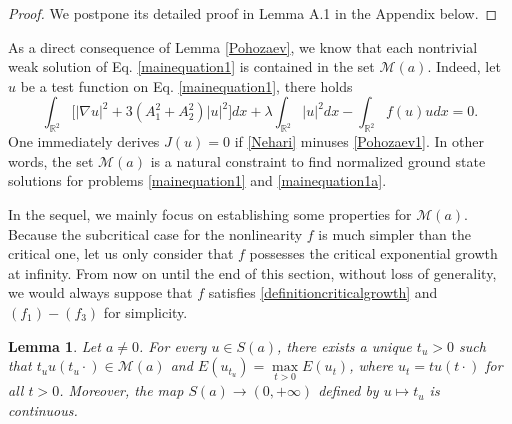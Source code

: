 \documentclass[11pt]{amsart}
\numberwithin{equation}{section}
\newtheorem{lemma}[theorem]{Lemma}
\theoremstyle{definition}
\newcommand{\R}{\mathbb{R}}
\begin{document}
\begin{proof}
We postpone its
 detailed proof in Lemma A.1 in the Appendix below.
\end{proof}

As a direct consequence of Lemma \ref{Pohozaev}, we know that each nontrivial weak solution of Eq. \eqref{mainequation1}
is contained in the set $\mathcal{M}(a)$. Indeed, let $u$ be a test function on Eq. \eqref{mainequation1}, there holds
\begin{equation}\label{Nehari}
\int_{\R^2}\big[|\nabla u|^2 +3(A_1^2+A_2^2)|u|^2\big]dx+ \lambda\int_{\R^2}|u|^2dx
- \int_{\R^2}f(u)udx
=0.
\end{equation}
One immediately derives $J(u)=0$ if \eqref{Nehari} minuses \eqref{Pohozaev1}. In other words, the set $\mathcal{M}(a)$
is a natural constraint to find normalized ground state solutions for problems \eqref{mainequation1}
and \eqref{mainequation1a}.


In the sequel, we mainly focus on establishing some properties for $\mathcal{M}(a)$.
Because the subcritical case for the nonlinearity $f$ is much simpler than the critical one,
let us only consider that $f$ possesses the critical exponential growth at infinity.
From now on until the end of this section, without loss of generality,
 we would always suppose that $f$
satisfies \eqref{definitioncriticalgrowth} and $(f_1)-(f_3)$ for simplicity.


\begin{lemma}\label{unique} Let $a\neq0$.
For every $u\in S(a)$, there exists a unique $t_u>0$ such that $t_uu(t_u\cdot)\in \mathcal{M}(a)$
and $E(u_{t_u})=\max\limits_{t>0}E(u_t)$, where $u_t=tu(t\cdot)$ for all $t>0$.
Moreover, the map $S(a)\to (0,+\infty)$ defined by $u\mapsto t_u$ is continuous.
\end{lemma}
\end{document}
